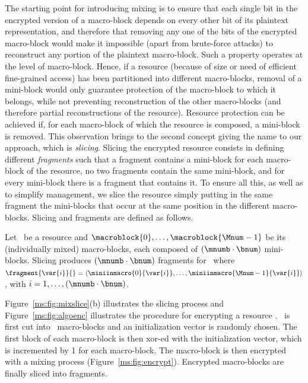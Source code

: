 The starting point for introducing mixing is to ensure that each single bit in the encrypted version of a macro-block depends on every other bit of its plaintext representation, and therefore that removing any one of the bits of the encrypted macro-block would make it impossible (apart from brute-force attacks) to reconstruct any portion of the plaintext macro-block. Such a property operates at the level of macro-block. Hence, if a resource (because of size or need of efficient fine-grained access) has been partitioned into different macro-blocks, removal of a mini-block would only guarantee protection of the macro-block to which it belongs, while not preventing reconstruction of the other macro-blocks (and therefore partial reconstructions of the resource). Resource protection can be achieved if, for each macro-block of which the resource is composed, a mini-block is removed. This observation brings to the second concept giving the name to our approach, which is {\em slicing}. Slicing the encrypted resource consists in defining different {\em fragments} such that a fragment contains a mini-block for each macro-block of the resource, no two fragments contain the same mini-block, and for every mini-block there is a fragment that contains it. To ensure all this, as well as to simplify management, we slice the resource simply putting in the same fragment the mini-blocks that occur at the same position in the different macro-blocks. Slicing and fragments are defined as follows.

\begin{dfn}
Let \resource\ be a resource and $\macroblock{0},\ldots,\macroblock{\Mnum-1}$ be its (individually mixed) macro-blocks, each composed of $(\mnumb \cdot \bnum)$ mini-blocks. Slicing produces $(\mnumb \cdot \bnum)$ fragments for \resource\ where $\fragment{\var{i}}{}=\langle\miniinmacro{0}{\var{i}},\ldots,\miniinmacro{\Mnum-1}{\var{i}}\rangle$, with $i=1,\ldots,(\mnumb \cdot \bnum)$.
\end{dfn}

Figure~\ref{ms:fig:mixslice}(b) illustrates the slicing process and Figure~\ref{ms:fig:algoenc} illustrates the procedure for encrypting a resource \resource. \resource\ is first cut into \Mnum\ macro-blocks and an initialization vector is randomly chosen. The first block of each macro-block is then {\sc xor}-ed with the initialization vector, which is incremented by 1 for each macro-block. The macro-block is then encrypted with a mixing process (Figure~\ref{ms:fig:encrypt}). Encrypted macro-blocks are finally sliced into fragments.


